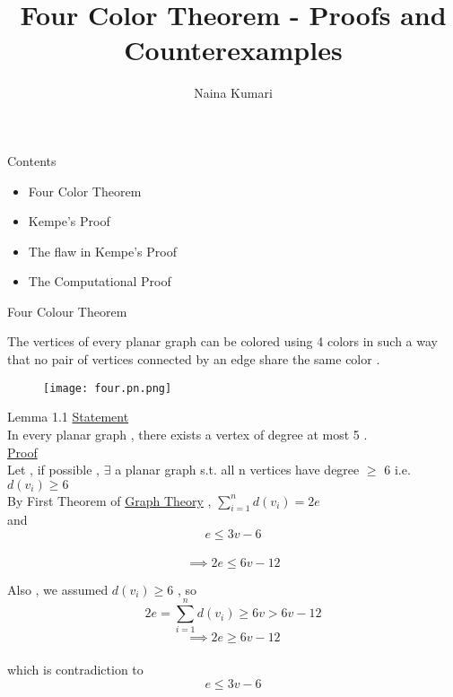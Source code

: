 \documentclass[12pt]{beamer}
\title{Four Color Theorem - Proofs and Counterexamples }
\author{Naina Kumari}
\institute{\begin{large}
IIT DELHI
\begin{figure}[h]
\texttt{[image: logo\_d]}
\end{figure}

\end{large}}
\begin{document}
\maketitle

\begin{frame}{Contents}
\begin{itemize}
\item Four Color Theorem
\item Kempe's Proof 
\item The flaw in Kempe's Proof 
\item The Computational Proof 
\end{itemize}
\end{frame}

\begin{frame}{Four Colour Theorem}
\begin{large}
The vertices of every planar graph can be colored using 4 colors
in such a way that no pair of vertices connected by an edge share the same color . 
\end{large}
\begin{figure}
\texttt{[image: four.pn.png]}
\end{figure}
\end{frame}

\begin{frame}{Lemma 1.1}
\underline {\large{Statement}}  \\
In every planar graph , there exists a vertex of degree at most 5 .\\
\underline {\large{Proof}}\\
Let , if possible , $\exists$ a planar graph s.t. all n vertices have degree $\geq$ 6 i.e. $d(v_i) \geq 6$ \\
By First Theorem of \hyperlink{page.27}{Graph Theory} , $\sum_{i=1}^{n} d(v_i) = 2e$\\
and $$e \leq 3v-6 $$ \\
$$\implies  2e \leq 6v-12$$  
\end{frame}

\begin{frame}
Also , we assumed $d(v_i) \geq 6$ , so \\
$$ 2e =  \sum_{i=1}^{n} d(v_i) \geq 6v  > 6v - 12$$
$$\implies 2e \geq 6v-12 $$ \\
which is contradiction to  $$e \leq 3v-6 $$
\end{frame}
\end{document}
